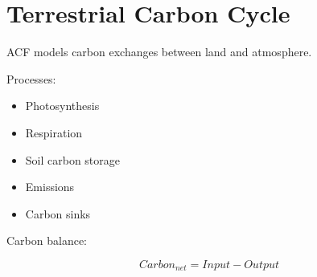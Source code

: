 \section{Terrestrial Carbon Cycle}


ACF models carbon exchanges between land and atmosphere.



Processes:


\begin{itemize}

\item Photosynthesis

\item Respiration

\item Soil carbon storage

\item Emissions

\item Carbon sinks

\end{itemize}



Carbon balance:


\[
Carbon_{net}=Input-Output
\]
